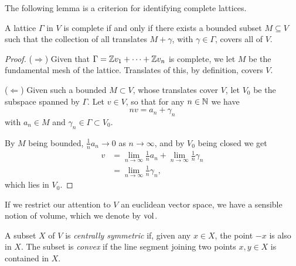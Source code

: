 The following lemma is a criterion for identifying complete lattices.

\begin{lem}
	A lattice $\Gamma$ in $V$ is complete if and only if there exists a bounded subset $M\subseteq V$ such that the collection of all translates $M+\gamma$, with $\gamma\in\Gamma$, covers all of $V$.
\end{lem}
\begin{proof}
	($\Longrightarrow$) Given that $\Gamma=\mathbb{Z} v_1 + \cdots + \mathbb{Z} v_n$ is complete, we let $M$ be the fundamental mesh of the lattice. Translates of this, by definition, covers $V$.

	($\Longleftarrow$) Given such a bounded $M\subset V$, whose translates cover $V$, let $V_0$ be the subspace spanned by $\Gamma$. Let $v\in V$, so that for any $n\in\mathbb{N}$ we have
	\[
		nv = a_n + \gamma_n
	\]
	with $a_n\in M$ and $\gamma_n\in\Gamma\subset V_0$.

	By $M$ being bounded, $\frac{1}{n}a_n \to 0$ as $n\to\infty$, and by $V_0$ being closed we get
	\begin{align*}
		v &= \lim_{n\to\infty}\frac{1}{n}a_n + \lim_{n\to\infty}\frac{1}{n}\gamma_n\\
			&= \lim_{n\to\infty} \frac{1}{n}\gamma_n,
	\end{align*}
	which lies in $V_0$.
\end{proof}

If we restrict our attention to $V$ an euclidean vector space, we have a sensible notion of volume, which we denote by $\operatorname{vol}$.

A subset $X$ of $V$ is \emph{centrally symmetric} if, given any $x\in X$, the point $-x$ is also in $X$. The subset is \emph{convex} if the line segment joining two points $x,y\in X$ is contained in $X$.

